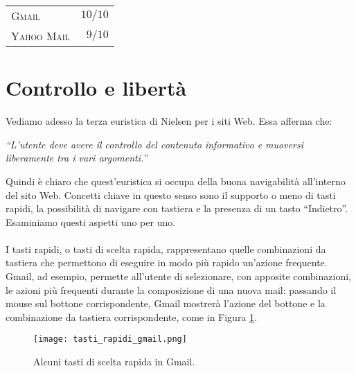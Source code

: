 		\begin{flushleft}
			\begin{tabular}{lr}
				\textsc{Gmail} & $10/10$\\
				\textsc{Yahoo Mail} & $9/10$
			\end{tabular}
		\end{flushleft}
	
	\section{Controllo e libert\`{a}} \label{sec:controllo_libertà}
	
		Vediamo adesso la terza euristica di Nielsen per i siti Web. Essa afferma che:
		\begin{center}
			\begin{minipage}{0.7\textwidth}
				\textit{``L'utente deve avere il controllo del contenuto informativo e muoversi liberamente tra i vari argomenti.''}
			\end{minipage}
		\end{center}
		
		Quindi è chiaro che quest'euristica si occupa della buona navigabilità all'interno del sito Web. Concetti chiave in questo senso sono il supporto o meno di tasti rapidi, la possibilità di navigare con tastiera e la presenza di un tasto ``Indietro''. Esaminiamo questi aspetti uno per uno.\\
		\\
		I tasti rapidi, o tasti di scelta rapida, rappresentano quelle combinazioni da tastiera che permettono di eseguire in modo più rapido un'azione frequente. Gmail, ad esempio, permette all'utente di selezionare, con apposite combinazioni, le azioni più frequenti durante la composizione di una nuova mail: passando il mouse sul bottone corrispondente, Gmail mostrerà l'azione del bottone e la combinazione da tastiera corrispondente, come in Figura \ref{fig:tasti_rapidi_gmail}.
		\begin{figure}[h!]
			\begin{center}
				\texttt{[image: tasti\_rapidi\_gmail.png]}
			\end{center}
			\caption[Tasti rapidi di Gmail]{Alcuni tasti di scelta rapida in Gmail.}
			\label{fig:tasti_rapidi_gmail}
		\end{figure}
		
